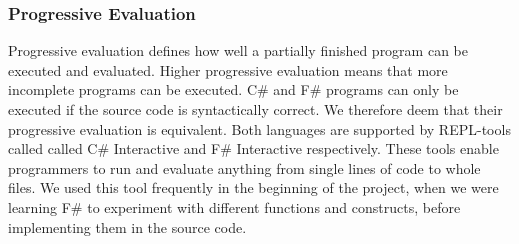\subsubsection{Progressive Evaluation}
Progressive evaluation defines how well a partially finished program can be executed and evaluated. Higher progressive evaluation means that more incomplete programs can be executed. C\# and F\# programs can only be executed if the source code is syntactically correct. We therefore deem that their progressive evaluation is equivalent. Both languages are supported by \gls{REPL}-tools called called C\# Interactive\cite{csharp:interactive} and F\# Interactive\cite{fsharp:interactive} respectively. These tools enable programmers to run and evaluate anything from single lines of code to whole files. We used this tool frequently in the beginning of the project, when we were learning F\# to experiment with different functions and constructs, before implementing them in the source code.